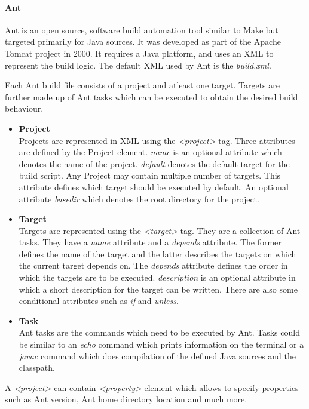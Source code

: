 \documentclass[12pt, a4paper, titlepage]{scrartcl}
\newcommand{\courierword}[1]{\textsf{\itshape #1}}{\fontfamily{pcr}\selectfont}%
\begin{document}
\paragraph{Ant}
\par Ant\cite{ant2004apache} is an open source, software build automation tool similar to Make but targeted primarily for Java sources. It was developed as part of the Apache Tomcat project in 2000. It requires a Java platform, and uses an XML to represent the build logic. The default XML used by Ant is the \courierword{build.xml}. 
\par Each Ant build file consists of a project and atleast one target. Targets are further made up of Ant tasks which can be executed to obtain the desired build behaviour.
\begin{itemize}
\item {\textbf{Project}}\\
Projects are represented in XML using the \textit{\textless project\textgreater}  tag. Three attributes are defined by the Project element. \textit{name} is an optional attribute which denotes the name of the project. \textit{default} denotes the default target for the build script. Any Project may contain multiple number of targets. This attribute defines which target should be executed by default. An optional attribute \textit{basedir} which denotes the root directory for the project. 
\item {\textbf{Target}} \\
Targets are represented using the \textit{\textless target\textgreater}  tag. They are a collection of Ant tasks. They have a \textit{name} attribute and a \textit{depends} attribute. The former defines the name of the target and the latter describes the targets on which the current target depends on. The \textit{depends} attribute defines the order in which the targets are to be executed\cite{williamson2002ant}. \textit{description} is an optional attribute in which a short description for the target can be written. There are also some conditional attributes such as \textit{if} and \textit{unless}.  
\item {\textbf{Task}}\\
Ant tasks are the commands which need to be executed by Ant. Tasks could be similar to an \courierword{echo} command which prints information on the terminal or a \courierword{javac} command which does compilation of the defined Java sources and the classpath. 
\end{itemize}
\par A \textit{\textless project\textgreater} can contain \textit{\textless property\textgreater} element which allows to specify properties such as Ant version, Ant home directory location and much more. 
\end{document}
